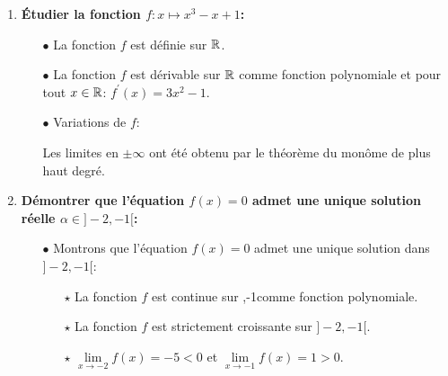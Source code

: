\documentclass[a4paper, 11pt,reqno]{article}
\begin{document}
\begin{correction}   \;
	\begin{enumerate}
		\item \textbf{\'Etudier la fonction $f: x\mapsto x^3-x+1$:}
		      \begin{itemize}
			      \item[$\bullet$] La fonction $f$ est d\'efinie sur $\mathbb{R}$.
			      \item[$\bullet$] La fonction $f$ est d\'erivable sur $\mathbb{R}$ comme fonction polynomiale et pour tout $x\in\mathbb{R}$: $f^{\prime}(x)=3x^2-1$.
			      \item[$\bullet$] Variations de $f$:
			            \begin{center}
			            \end{center}
			            Les limites en $\pm\infty$ ont \'et\'e obtenu par le th\'eor\`{e}me du mon\^{o}me de plus haut degr\'e.
		      \end{itemize}
		\item \textbf{D\'emontrer que l'\'equation $f(x)=0$ admet une unique solution r\'eelle $\alpha\in\rbrack -2,-1\lbrack$:}
		      \begin{itemize}
			      \item[$\bullet$] Montrons que l'\'equation $f(x)=0$ admet une unique solution dans $\rbrack -2,-1\lbrack$:
			            \begin{itemize}
				            \item[$\star$] La fonction $f$ est continue sur ,-1\lbrack comme fonction polynomiale.
				            \item[$\star$] La fonction $f$ est strictement croissante sur $\rbrack -2,-1\lbrack$.
				            \item[$\star$] $\lim\limits_{x\to -2} f(x)=-5<0$ et $\lim\limits_{x\to -1} f(x)=1>0$.

\end{itemize}
\end{itemize}
\end{enumerate}
\end{correction}
\end{document}
